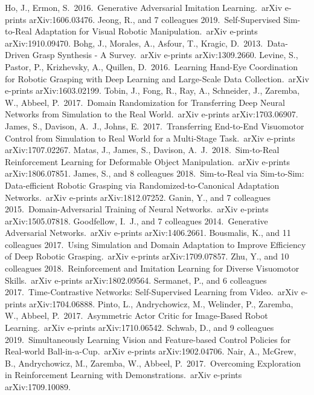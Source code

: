 \documentclass{mipt-thesis-bs}
\begin{document}
\begin{thebibliography}{99}
     Ho, J., Ermon, S.\ 2016.\ Generative Adversarial Imitation Learning.\ arXiv e-prints arXiv:1606.03476.
     Jeong, R., and 7 colleagues 2019.\ Self-Supervised Sim-to-Real Adaptation for Visual Robotic Manipulation.\ arXiv e-prints arXiv:1910.09470.
     Bohg, J., Morales, A., Asfour, T., Kragic, D.\ 2013.\ Data-Driven Grasp Synthesis - A Survey.\ arXiv e-prints arXiv:1309.2660.
     Levine, S., Pastor, P., Krizhevsky, A., Quillen, D.\ 2016.\ Learning Hand-Eye Coordination for Robotic Grasping with Deep Learning and Large-Scale Data Collection.\ arXiv e-prints arXiv:1603.02199.
     Tobin, J., Fong, R., Ray, A., Schneider, J., Zaremba, W., Abbeel, P.\ 2017.\ Domain Randomization for Transferring Deep Neural Networks from Simulation to the Real World.\ arXiv e-prints arXiv:1703.06907.
     James, S., Davison, A.~J., Johns, E.\ 2017.\ Transferring End-to-End Visuomotor Control from Simulation to Real World for a Multi-Stage Task.\ arXiv e-prints arXiv:1707.02267.
     Matas, J., James, S., Davison, A.~J.\ 2018.\ Sim-to-Real Reinforcement Learning for Deformable Object Manipulation.\ arXiv e-prints arXiv:1806.07851.
     James, S., and 8 colleagues 2018.\ Sim-to-Real via Sim-to-Sim: Data-efficient Robotic Grasping via Randomized-to-Canonical Adaptation Networks.\ arXiv e-prints arXiv:1812.07252.
     Ganin, Y., and 7 colleagues 2015.\ Domain-Adversarial Training of Neural Networks.\ arXiv e-prints arXiv:1505.07818.
     Goodfellow, I.~J., and 7 colleagues 2014.\ Generative Adversarial Networks.\ arXiv e-prints arXiv:1406.2661.
    Bousmalis, K., and 11 colleagues 2017.\ Using Simulation and Domain Adaptation to Improve Efficiency of Deep Robotic Grasping.\ arXiv e-prints arXiv:1709.07857.
     Zhu, Y., and 10 colleagues 2018.\ Reinforcement and Imitation Learning for Diverse Visuomotor Skills.\ arXiv e-prints arXiv:1802.09564.
     Sermanet, P., and 6 colleagues 2017.\ Time-Contrastive Networks: Self-Supervised Learning from Video.\ arXiv e-prints arXiv:1704.06888.
     Pinto, L., Andrychowicz, M., Welinder, P., Zaremba, W., Abbeel, P.\ 2017.\ Asymmetric Actor Critic for Image-Based Robot Learning.\ arXiv e-prints arXiv:1710.06542.
     Schwab, D., and 9 colleagues 2019.\ Simultaneously Learning Vision and Feature-based Control Policies for Real-world Ball-in-a-Cup.\ arXiv e-prints arXiv:1902.04706.
    Nair, A., McGrew, B., Andrychowicz, M., Zaremba, W., Abbeel, P.\ 2017.\ Overcoming Exploration in Reinforcement Learning with Demonstrations.\ arXiv e-prints arXiv:1709.10089.
    
\end{thebibliography}
\end{document}
